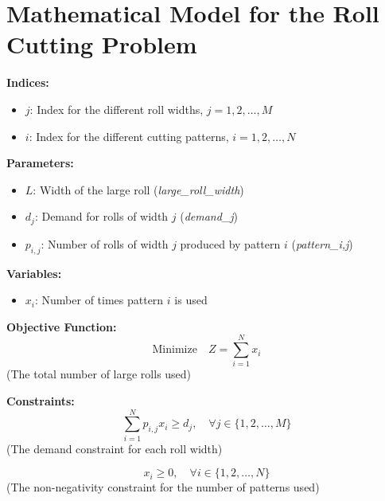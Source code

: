 \documentclass{article}
\begin{document}
\section*{Mathematical Model for the Roll Cutting Problem}

\textbf{Indices:}
\begin{itemize}
    \item \( j \): Index for the different roll widths, \( j = 1, 2, \ldots, M \) 
    \item \( i \): Index for the different cutting patterns, \( i = 1, 2, \ldots, N \)
\end{itemize}

\textbf{Parameters:}
\begin{itemize}
    \item \( L \): Width of the large roll (\textit{large\_roll\_width})
    \item \( d_j \): Demand for rolls of width \( j \) (\textit{demand\_j})
    \item \( p_{i,j} \): Number of rolls of width \( j \) produced by pattern \( i \) (\textit{pattern\_{i,j}})
\end{itemize}

\textbf{Variables:}
\begin{itemize}
    \item \( x_i \): Number of times pattern \( i \) is used
\end{itemize}

\textbf{Objective Function:}
\[
\text{Minimize} \quad Z = \sum_{i=1}^{N} x_i
\]
(The total number of large rolls used)

\textbf{Constraints:}
\[
\sum_{i=1}^{N} p_{i,j} x_i \geq d_j, \quad \forall j \in \{1, 2, \ldots, M\}
\]
(The demand constraint for each roll width)

\[
x_i \geq 0, \quad \forall i \in \{1, 2, \ldots, N\}
\]
(The non-negativity constraint for the number of patterns used)
\end{document}
